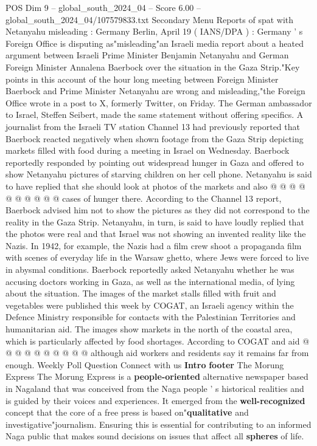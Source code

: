 \begin{textsample}{POS Dim 9 – global\_south\_2024\_04 – Score 6.00 – global\_south\_2024\_04/107579833.txt}  \label{ex:f9_pos_073}
Secondary Menu Reports of spat with Netanyahu misleading : Germany Berlin, April 19 ( IANS/DPA ) : Germany ' s Foreign Office is disputing as"misleading"an Israeli media report about a heated argument between Israeli Prime Minister Benjamin Netanyahu and German Foreign Minister Annalena Baerbock over the situation in the Gaza Strip."Key points in this account of the hour long meeting between Foreign Minister Baerbock and Prime Minister Netanyahu are wrong and misleading,"the Foreign Office wrote in a post to X, formerly Twitter, on Friday.
The German ambassador to Israel, Steffen Seibert, made the same statement without offering specifics.
A journalist from the Israeli TV station Channel 13 had previously reported that Baerbock reacted negatively when shown footage from the Gaza Strip depicting markets filled with food during a meeting in Israel on Wednesday.
Baerbock reportedly responded by pointing out widespread hunger in Gaza and offered to show Netanyahu pictures of starving children on her cell phone.
Netanyahu is said to have replied that she should look at photos of the markets and also @ @ @ @ @ @ @ @ @ @ cases of hunger there.
According to the Channel 13 report, Baerbock advised him not to show the pictures as they did not correspond to the reality in the Gaza Strip.
Netanyahu, in turn, is said to have loudly replied that the photos were real and that Israel was not showing an invented reality like the Nazis.
In 1942, for example, the Nazis had a film crew shoot a propaganda film with scenes of everyday life in the Warsaw ghetto, where Jews were forced to live in abysmal conditions.
Baerbock reportedly asked Netanyahu whether he was accusing doctors working in Gaza, as well as the international media, of lying about the situation.
The images of the market stalls filled with fruit and vegetables were published this week by COGAT, an Israeli agency within the Defence Ministry responsible for contacts with the Palestinian Territories and humanitarian aid.
The images show markets in the north of the coastal area, which is particularly affected by food shortages.
According to COGAT and aid @ @ @ @ @ @ @ @ @ @ although aid workers and residents say it remains far from enough.
Weekly Poll Question Connect with us \textbf{Intro} \textbf{footer} The Morung Express The Morung Express is a \textbf{people-oriented} alternative newspaper based in Nagaland that was conceived from the Naga people ' s historical realities and is guided by their voices and experiences.
It emerged from the \textbf{well-recognized} concept that the core of a free press is based on"\textbf{qualitative} and investigative"journalism.
Ensuring this is essential for contributing to an informed Naga public that makes sound decisions on issues that affect all \textbf{spheres} of life.

\end{textsample}
